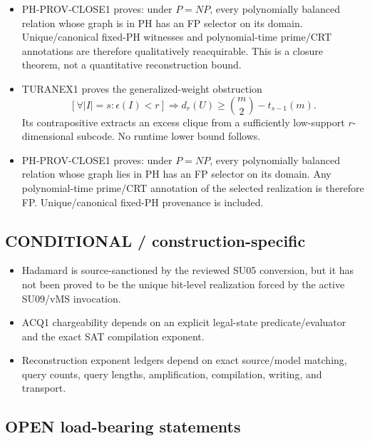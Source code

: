 \documentclass[11pt]{article}
\begin{document}
\begin{itemize}
\item PH-PROV-CLOSE1 proves: under \(P=NP\), every polynomially balanced relation whose graph is
in PH has an FP selector on its domain. Unique/canonical fixed-PH witnesses and polynomial-time
prime/CRT annotations are therefore qualitatively reacquirable. This is a closure theorem, not a
quantitative reconstruction bound.

\item TURANEX1 proves the generalized-weight obstruction
\[
\left[\forall |I|=s:\epsilon(I)<r\right]
\Longrightarrow
d_r(U)\ge\binom m2-t_{s-1}(m).
\]
Its contrapositive extracts an excess clique from a sufficiently low-support \(r\)-dimensional
subcode. No runtime lower bound follows.

\item PH-PROV-CLOSE1 proves: under \(P=NP\), every polynomially balanced relation whose graph lies
in PH has an FP selector on its domain. Any polynomial-time prime/CRT annotation of the selected
realization is therefore FP. Unique/canonical fixed-PH provenance is included.
\end{itemize}

\subsection{CONDITIONAL / construction-specific}

\begin{itemize}
\item Hadamard is source-sanctioned by the reviewed SU05 conversion, but it has not been proved to be
the unique bit-level realization forced by the active SU09/vMS invocation.
\item ACQ1 chargeability depends on an explicit legal-state predicate/evaluator and the exact SAT
compilation exponent.
\item Reconstruction exponent ledgers depend on exact source/model matching, query counts, query
lengths, amplification, compilation, writing, and transport.
\end{itemize}

\subsection{OPEN load-bearing statements}
\end{document}
